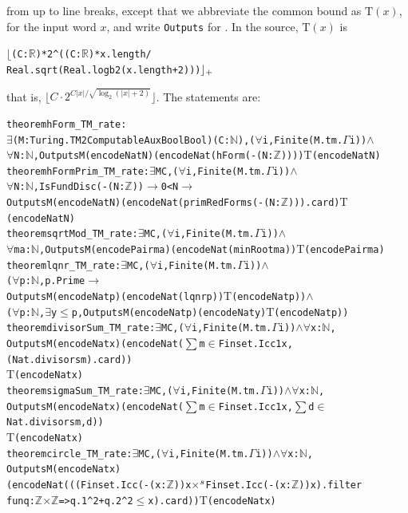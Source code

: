 \documentclass[10pt]{amsart}
\theoremstyle{plain}
\theoremstyle{definition}
\theoremstyle{remark}
\numberwithin{equation}{section}
\begin{document}
from  up to line breaks, except that we abbreviate the common bound as $\mathrm{T}(x)$, for the input word $x$,
and write \texttt{Outputs} for . In the source, $\mathrm{T}(x)$ is
\begin{alltt}\footnotesize
\(\lfloor\)(C : \(\mathbb{R}\)) * 2 ^ ((C : \(\mathbb{R}\)) * x.length /
    Real.sqrt (Real.logb 2 (x.length + 2)))\(\rfloor\sb{+}\)
\end{alltt}
that is, $\lfloor C\cdot2^{C|x|/\sqrt{\log_2(|x|+2)}}\rfloor$. The statements are:
\begin{alltt}\footnotesize
theorem hForm_TM_rate :
  \(\exists\) (M : Turing.TM2ComputableAux Bool Bool) (C : \(\mathbb{N}\)), (\(\forall\) i, Finite (M.tm.\(\Gamma\) i)) \(\wedge\)
  \(\forall\) N : \(\mathbb{N}\), Outputs M (encodeNat N) (encodeNat (hForm (-(N : \(\mathbb{Z}\))))) \(\mathrm{T}\)(encodeNat N)
theorem hFormPrim_TM_rate : \(\exists\) M C, (\(\forall\) i, Finite (M.tm.\(\Gamma\) i)) \(\wedge\)
  \(\forall\) N : \(\mathbb{N}\), IsFundDisc (-(N : \(\mathbb{Z}\))) \(\to\) 0 < N \(\to\)
    Outputs M (encodeNat N) (encodeNat (primRedForms (-(N : \(\mathbb{Z}\)))).card) \(\mathrm{T}\)(encodeNat N)
theorem sqrtMod_TM_rate : \(\exists\) M C, (\(\forall\) i, Finite (M.tm.\(\Gamma\) i)) \(\wedge\)
  \(\forall\) m a : \(\mathbb{N}\), Outputs M (encodePair m a) (encodeNat (minRoot m a)) \(\mathrm{T}\)(encodePair m a)
theorem lqnr_TM_rate : \(\exists\) M C, (\(\forall\) i, Finite (M.tm.\(\Gamma\) i)) \(\wedge\)
  (\(\forall\) p : \(\mathbb{N}\), p.Prime \(\to\)
     Outputs M (encodeNat p) (encodeNat (lqnr p)) \(\mathrm{T}\)(encodeNat p)) \(\wedge\)
  (\(\forall\) p : \(\mathbb{N}\), \(\exists\) y \(\le\) p, Outputs M (encodeNat p) (encodeNat y) \(\mathrm{T}\)(encodeNat p))
theorem divisorSum_TM_rate : \(\exists\) M C, (\(\forall\) i, Finite (M.tm.\(\Gamma\) i)) \(\wedge\) \(\forall\) x : \(\mathbb{N}\),
  Outputs M (encodeNat x) (encodeNat (\(\sum\) m \(\in\) Finset.Icc 1 x, (Nat.divisors m).card))
    \(\mathrm{T}\)(encodeNat x)
theorem sigmaSum_TM_rate : \(\exists\) M C, (\(\forall\) i, Finite (M.tm.\(\Gamma\) i)) \(\wedge\) \(\forall\) x : \(\mathbb{N}\),
  Outputs M (encodeNat x) (encodeNat (\(\sum\) m \(\in\) Finset.Icc 1 x, \(\sum\) d \(\in\) Nat.divisors m, d))
    \(\mathrm{T}\)(encodeNat x)
theorem circle_TM_rate : \(\exists\) M C, (\(\forall\) i, Finite (M.tm.\(\Gamma\) i)) \(\wedge\) \(\forall\) x : \(\mathbb{N}\),
  Outputs M (encodeNat x)
    (encodeNat (((Finset.Icc (-(x : \(\mathbb{Z}\))) x \(\times\)\(\sp{s}\) Finset.Icc (-(x : \(\mathbb{Z}\))) x).filter
      fun q : \(\mathbb{Z}\) \(\times\) \(\mathbb{Z}\) => q.1 ^ 2 + q.2 ^ 2 \(\le\) x).card)) \(\mathrm{T}\)(encodeNat x)
\end{alltt}
\end{document}
